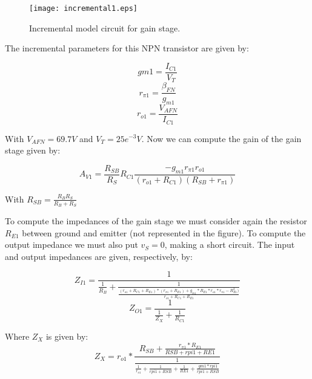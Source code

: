 \begin{figure}[H] \centering
\texttt{[image: incremental1.eps]}
\caption{Incremental model circuit for gain stage.}
\label{fig:inc1}
\end{figure}

\par The incremental parameters for this NPN transistor are given by:

\begin{equation}
gm1=\frac{I_{C1}}{V_T}
\end{equation}
\begin{equation}
r_{\pi 1}=\frac{\beta _{FN}}{g_{m1}}
\end{equation}
\begin{equation}
r_{o1}=\frac{V_{AFN}}{I_{C1}}
\end{equation}

\par With $V_{AFN}=69.7V$ and $V_T=25e^{-3}V$. Now we can compute the gain of the gain stage given by:

\begin{equation}
A_{V1}=\frac{R_{SB}}{R_S}R_{C1}\frac{-g_{m1}r_{\pi 1}r_{o1}}{(r_{o1}+R_{C1})(R_{SB}+r_{\pi 1})}
\end{equation}
\par With $R_{SB}=\frac {R_BR_S}{R_B+R_S}$

\par To compute the impedances of the gain stage we must consider again the resistor $R_{E1}$ between ground and emitter (not represented in the figure). To compute the output impedance we must also put $v_S=0$, making a short circuit. The input and output impedances are given, respectively, by:

\begin{equation}
Z_{I1}=\frac{1}{\frac{1}{R_B}+\frac{1}{\frac{(r_{o1}+R_{C1}+R_{E1})*(r_{\pi 1}+R_{E1})+g_{m1}*R_{E1}*r_{o1}*r_{\pi 1} - R_{E1}^2)}{r_{o1}+R_{C1}+R_{E1}}}}
\end{equation} 
\begin{equation}
Z_{O1} = \frac{1}{\frac{1}{Z_X}+\frac{1}{R_{C1}}}
\end{equation}
\par Where $Z_X$ is given by:
\begin{equation}
Z_X = r_{o1}*\frac{R_{SB}+\frac{r_{\pi 1}*R_{E1}}{RSB+rpi1+RE1}}{\frac{1}{\frac{1}{r_{o1}}+\frac{1}{rpi1+RSB}+\frac{1}{RE1}+\frac{gm1*rpi1}{rpi1+RSB}}}
\end{equation}

